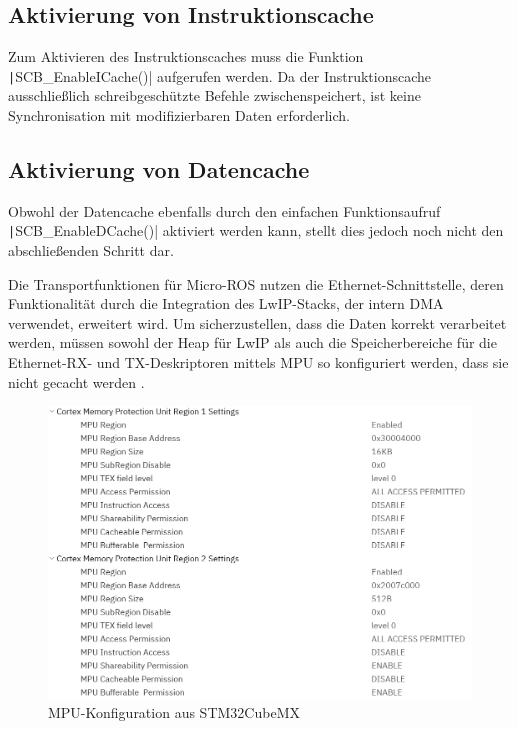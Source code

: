 \subsection{Aktivierung von Instruktionscache}

Zum Aktivieren des Instruktionscaches muss die Funktion
\texttt|SCB_EnableICache()| aufgerufen werden. Da der Instruktionscache
ausschließlich schreibgeschützte Befehle zwischenspeichert, ist keine
Synchronisation mit modifizierbaren Daten erforderlich.

\subsection{Aktivierung von Datencache}

Obwohl der Datencache ebenfalls durch den einfachen Funktionsaufruf
\texttt|SCB_EnableDCache()| aktiviert werden kann, stellt dies jedoch
noch nicht den abschließenden Schritt dar.

Die Transportfunktionen für Micro-ROS nutzen die Ethernet-Schnittstelle, deren
Funktionalität durch die Integration des LwIP-Stacks, der intern DMA verwendet,
erweitert wird. Um sicherzustellen, dass die Daten korrekt verarbeitet werden,
müssen sowohl der Heap für LwIP als auch die Speicherbereiche für die
Ethernet-RX- und TX-Deskriptoren mittels \ac{MPU} so konfiguriert werden, dass
sie nicht gecacht werden \cite{STM32H7_LwIP_Examples}.

\begin{figure}[H]
    \centering
    \includegraphics[width=1\textwidth]{assets/mpu_conf_cubemx}
    \caption{MPU-Konfiguration aus STM32CubeMX}
\end{figure}


